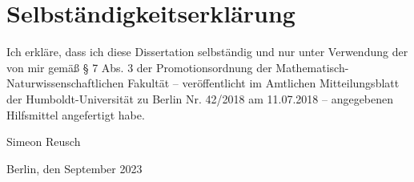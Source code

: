 \chapter*{Selbständigkeitserklärung}\label{bla}

Ich erkläre, dass ich diese Dissertation selbständig und nur unter Verwendung der von mir gemäß § 7 Abs. 3 der Promotionsordnung der Mathematisch-Naturwissenschaftlichen Fakultät -- veröffentlicht im Amtlichen Mitteilungsblatt der Humboldt-Universität zu Berlin Nr. 42/2018 am 11.07.2018 -- angegebenen Hilfsmittel angefertigt habe.

\vspace{18mm}
\begin{minipage}{2in}
    Simeon Reusch
\end{minipage}
\hfill
\begin{minipage}{2in}
    Berlin, den \xx September 2023
\end{minipage}